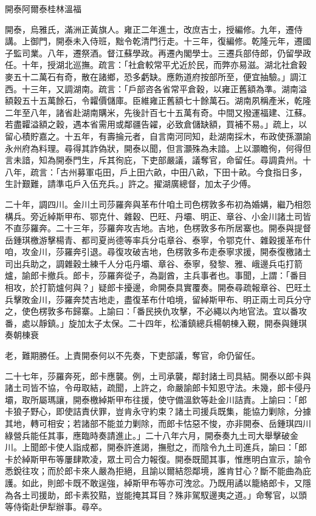 
\begin{pinyinscope}
開泰阿爾泰桂林溫福

開泰，烏雅氏，滿洲正黃旗人。雍正二年進士，改庶吉士，授編修。九年，遷侍講。上御門，開泰未入侍班，黜令乾清門行走。十三年，復編修。乾隆元年，遷國子監司業。八年，遷祭酒。督江蘇學政。再遷內閣學士。三遷兵部侍郎，仍留學政任。十年，授湖北巡撫。疏言：「社倉較常平尤近於民，而弊亦易滋。湖北社倉穀麥五十二萬石有奇，散在諸鄉，恐多虧缺。應飭道府按部所至，便宜抽驗。」調江西。十三年，又調湖南。疏言：「戶部咨各省常平倉穀，以雍正舊額為準。湖南溢額穀五十五萬餘石，令糶價儲庫。臣維雍正舊額七十餘萬石。湖南夙稱產米，乾隆二年至八年，諸省赴湖南購米，先後計百七十五萬有奇。中間又撥運福建、江蘇。若盡糶溢額之穀，遇本省需用或鄰疆告糴，必致倉儲缺額，買補不易。」疏上，以留心積貯嘉之。十五年，有壽掄元者，自言南河同知，赴湖南採木，布政使孫灝諭永州府為料理。尋得其詐偽狀，開泰以聞，但言灝殊為未諳。上以灝瞻徇，何得但言未諳，知為開泰門生，斥其徇庇，下吏部嚴議，議奪官，命留任。尋調貴州。十八年，疏言：「古州募軍屯田，戶上田六畝，中田八畝，下田十畝。今食指日多，生計艱難，請準屯戶入伍充兵。」許之。擢湖廣總督，加太子少傅。

二十年，調四川。金川土司莎羅奔與革布什咱土司色楞敦多布初為婚媾，繼乃相怨構兵。旁近綽斯甲布、鄂克什、雜穀、巴旺、丹壩、明正、章谷、小金川諸土司皆不直莎羅奔。二十三年，莎羅奔攻吉地。吉地，色楞敦多布所居寨也。開泰與提督岳鍾琪檄游擊楊青、都司夏尚德等率兵分屯章谷、泰寧，令鄂克什、雜穀援革布什咱，攻金川，莎羅奔引退。尋復攻破吉地，色楞敦多布走泰寧求援，開泰復檄諸土司出兵助之，調雜穀土練千人分屯丹壩、章谷、泰寧，發黎、雅、峨邊兵屯打箭爐，諭郎卡撤兵。郎卡，莎羅奔從子，為副酋，主兵事者也。事聞，上謂：「番目相攻，於打箭爐何與？」疑郎卡擾邊，命開泰具實覆奏。開泰尋疏報章谷、巴旺土兵擊敗金川，莎羅奔焚吉地走，盡復革布什咱境，留綽斯甲布、明正兩土司兵分守之，使色楞敦多布歸寨。上諭曰：「番民挾仇攻擊，不必繩以內地官法。宜以番攻番，處以靜鎮。」旋加太子太保。二十四年，松潘鎮總兵楊朝棟入覲，開泰與鍾琪奏朝棟衰

老，難期勝任。上責開泰何以不先奏，下吏部議，奪官，命仍留任。

二十七年，莎羅奔死，郎卡應襲。例，土司承襲，鄰封諸土司具結。開泰以郎卡與諸土司皆不協，令毋取結，疏聞，上許之，命嚴諭郎卡知恩守法。未幾，郎卡侵丹壩，取所屬瑪讓，開泰檄綽斯甲布往援，使守備溫欽等赴金川詰責。上諭曰：「郎卡狼子野心，即使詰責伏罪，豈肯永守約束？諸土司援兵既集，能協力剿除，分據其地，轉可相安；若諸部不能並力剿除，而郎卡怙惡不悛，亦非開泰、岳鍾琪四川綠營兵能任其事，應臨時奏請進止。」二十八年六月，開泰奏九土司大舉擊破金川。上聞郎卡使人詣成都，開泰許進謁，撫慰之，而陰令九土司進兵，諭曰：「郎卡於綽斯甲布等屢肆欺凌，眾土司合力報復。開泰既聞其事，惟應明白宣示，諭令悉銳往攻；而於郎卡來人嚴為拒絕，且諭以爾結怨鄰境，誰肯甘心？斷不能曲為庇護。如此，則郎卡既不敢逞強，綽斯甲布等亦可洩忿。乃既用譎以籠絡郎卡，又隱為各土司援助，郎卡素狡黠，豈能掩其耳目？殊非駕馭邊夷之道。」命奪官，以頭等侍衛赴伊犁辦事。尋卒。


\end{pinyinscope}
